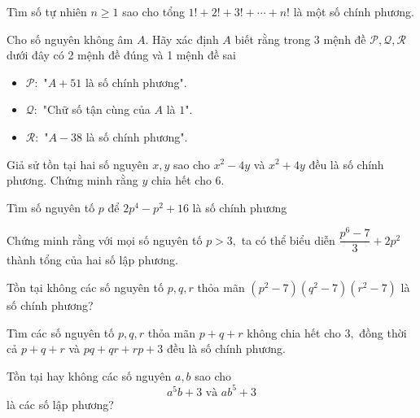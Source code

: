 \begin{btt}
Tìm số tự nhiên $n \ge 1$ sao cho tổng $1!+2!+3!+\cdots+n!$ là một số chính phương.
\end{btt}

\begin{btt}
Cho số nguyên không âm $A.$ Hãy xác định $A$ biết rằng trong $3$ mệnh đề $\mathcal{P}, \mathcal{Q}, \mathcal{R}$ dưới đây có 2 mệnh đề đúng và 1 mệnh đề sai
\begin{itemize}
    \item $\mathcal{P}:$ "$A+51$ là số chính phương".
    \item $\mathcal{Q}:$ "Chữ số tận cùng của $A$ là $1$".
    \item $\mathcal{R}:$ "$A-38$ là số chính phương".
\end{itemize}
\end{btt}

\begin{btt}
Giả sử tồn tại hai số nguyên $x,y$ sao cho $x^2-4y$ và $x^2+4y$ đều là số chính phương. Chứng minh rằng $y$ chia hết cho $6.$
\end{btt}

\begin{btt}
Tìm số nguyên tố $p$ để $2p^4-p^2+16$ là số chính phương
\end{btt}

\begin{btt}
Chứng minh rằng với mọi số nguyên tố $p>3,$ ta có thể biểu diễn $\dfrac{p^6-7}{3}+2p^2$ thành tổng của hai số lập phương.
\end{btt}

\begin{btt}
Tồn tại không các số nguyên tố $p,q,r$ thỏa mãn $\left(p^2-7\right)\left(q^2-7\right)\left(r^2-7\right)$
là số chính phương?
\end{btt}

\begin{btt}
Tìm các số nguyên tố $p,q,r$ thỏa mãn $p+q+r$ không chia hết cho $3,$ đồng thời cả $p+q+r$ và $pq+qr+rp+3$ đều là số chính phương.
\end{btt}

\begin{btt}
Tồn tại hay không các số nguyên $a,b$ sao cho $$a^5b+3\text{ và }ab^5+3$$
là các số lập phương?
\end{btt}

